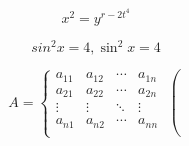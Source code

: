 \documentclass[a4paper]{article}
\begin{document}
\begin{displaymath}
	x^2 = y^{r-2t^4}
\end{displaymath}

\begin{displaymath}
	sin^2 x = 4,
	\sin^2 x = 4
\end{displaymath}



\begin{displaymath}
	A=\left\{
	\begin{array}{cccc}
	a_{11} & a_{12} & \cdots & a_{1n}\\
	a_{21} & a_{22} & \cdots & a_{2n}\\
	\vdots & \vdots & \ddots & \vdots\\
	a_{n1} & a_{n2} & \cdots & a_{nn}\\
	\end{array}
	\right(
	\end{displaymath}
\end{document}
